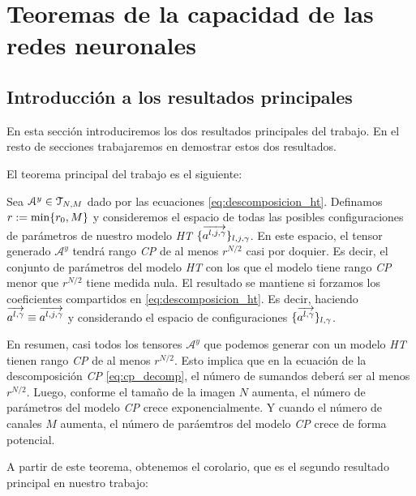 \chapter{Teoremas de la capacidad de las redes neuronales} \label{chapter:teoremas_y_demostraciones}

\section{Introducción a los resultados principales}

En esta sección introduciremos los dos resultados principales del trabajo. En el resto de secciones trabajaremos en demostrar estos dos resultados.

El teorema principal del trabajo es el siguiente:

\begin{teorema} \label{teorema:teorema_principal_introduccion}

Sea $\mathcal{A}^y \in \mathcal{T}_{N, M}$ dado por las ecuaciones \eqref{eq:descomposicion_ht}. Definamos $r := \min \{ r_0, M \}$ y consideremos el espacio de todas las posibles configuraciones de parámetros de nuestro modelo \textit{HT} $\{  \overrightarrow{a^{l, j, \gamma}} \}_{l, j, \gamma}$. En este espacio, el tensor generado $\mathcal{A}^y$ tendrá rango \textit{CP} de al menos $r^{N/2}$ casi por doquier. Es decir, el conjunto de parámetros del modelo \textit{HT} con los que el modelo tiene rango \textit{CP} menor que $r^{N/2}$ tiene medida nula. El resultado se mantiene si forzamos los coeficientes compartidos en \eqref{eq:descomposicion_ht}. Es decir, haciendo $\overrightarrow{a^{l, \gamma}} \equiv \overrightarrow{a^{l, j, \gamma}}$ y considerando el espacio de configuraciones $\{ \overrightarrow{a^{l, \gamma}}  \}_{l, \gamma}$.

\end{teorema}

En resumen, casi todos los tensores $\mathcal{A}^y$ que podemos generar con un modelo \textit{HT} tienen rango \textit{CP} de al menos $r^{N/2}$. Esto implica que en la ecuación de la descomposición \textit{CP} \eqref{eq:cp_decomp}, el número de sumandos deberá ser al menos $r^{N/2}$. Luego, conforme el tamaño de la imagen $N$ aumenta, el número de parámetros del modelo \textit{CP} crece exponencialmente. Y cuando el número de canales $M$ aumenta, el número de paráemtros del modelo \textit{CP} crece de forma potencial.

A partir de este teorema, obtenemos el corolario, que es el segundo resultado principal en nuestro trabajo:

